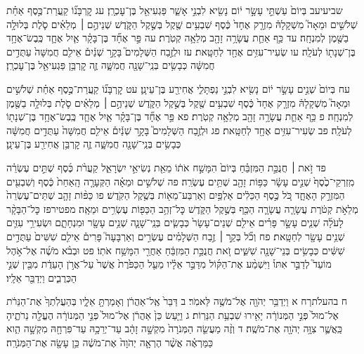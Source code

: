 \documentclass[twoside, openany, parskip=half, 11pt]{book}
\begin{document}
שביעיעב בְּיוֹם֙ עַשְׁתֵּ֣י עָשָׂ֣ר י֔וֹם נָשִׂ֖יא לִבְנֵ֣י אָשֵׁ֑ר פַּגְעִיאֵ֖ל בֶּן־עׇכְרָֽן׃ עג קׇרְבָּנ֞וֹ קַֽעֲרַת־כֶּ֣סֶף אַחַ֗ת שְׁלֹשִׁ֣ים וּמֵאָה֮ מִשְׁקָלָהּ֒ מִזְרָ֤ק אֶחָד֙ כֶּ֔סֶף שִׁבְעִ֥ים שֶׁ֖קֶל בְּשֶׁ֣קֶל הַקֹּ֑דֶשׁ שְׁנֵיהֶ֣ם ׀ מְלֵאִ֗ים סֹ֛לֶת בְּלוּלָ֥ה בַשֶּׁ֖מֶן לְמִנְחָֽה׃ עד כַּ֥ף אַחַ֛ת עֲשָׂרָ֥ה זָהָ֖ב מְלֵאָ֥ה קְטֹֽרֶת׃ עה פַּ֣ר אֶחָ֞ד בֶּן־בָּקָ֗ר אַ֧יִל אֶחָ֛ד כֶּֽבֶשׂ־אֶחָ֥ד בֶּן־שְׁנָת֖וֹ לְעֹלָֽה׃ עו שְׂעִיר־עִזִּ֥ים אֶחָ֖ד לְחַטָּֽאת׃ עז וּלְזֶ֣בַח הַשְּׁלָמִים֮ בָּקָ֣ר שְׁנַ֒יִם֒ אֵילִ֤ם חֲמִשָּׁה֙ עַתֻּדִ֣ים חֲמִשָּׁ֔ה כְּבָשִׂ֥ים בְּנֵֽי־שָׁנָ֖ה חֲמִשָּׁ֑ה זֶ֛ה קׇרְבַּ֥ן פַּגְעִיאֵ֖ל בֶּן־עׇכְרָֽן׃

עח בְּיוֹם֙ שְׁנֵ֣ים עָשָׂ֣ר י֔וֹם נָשִׂ֖יא לִבְנֵ֣י נַפְתָּלִ֑י אֲחִירַ֖ע בֶּן־עֵינָֽן׃ עט קׇרְבָּנ֞וֹ קַֽעֲרַת־כֶּ֣סֶף אַחַ֗ת שְׁלֹשִׁ֣ים וּמֵאָה֮ מִשְׁקָלָהּ֒ מִזְרָ֤ק אֶחָד֙ כֶּ֔סֶף שִׁבְעִ֥ים שֶׁ֖קֶל בְּשֶׁ֣קֶל הַקֹּ֑דֶשׁ שְׁנֵיהֶ֣ם ׀ מְלֵאִ֗ים סֹ֛לֶת בְּלוּלָ֥ה בַשֶּׁ֖מֶן לְמִנְחָֽה׃ פ כַּ֥ף אַחַ֛ת עֲשָׂרָ֥ה זָהָ֖ב מְלֵאָ֥ה קְטֹֽרֶת׃ פא פַּ֣ר אֶחָ֞ד בֶּן־בָּקָ֗ר אַ֧יִל אֶחָ֛ד כֶּֽבֶשׂ־אֶחָ֥ד בֶּן־שְׁנָת֖וֹ לְעֹלָֽה׃ פב שְׂעִיר־עִזִּ֥ים אֶחָ֖ד לְחַטָּֽאת׃ פג וּלְזֶ֣בַח הַשְּׁלָמִים֮ בָּקָ֣ר שְׁנַ֒יִם֒ אֵילִ֤ם חֲמִשָּׁה֙ עַתֻּדִ֣ים חֲמִשָּׁ֔ה כְּבָשִׂ֥ים בְּנֵֽי־שָׁנָ֖ה חֲמִשָּׁ֑ה זֶ֛ה קׇרְבַּ֥ן אֲחִירַ֖ע בֶּן־עֵינָֽן׃

פד זֹ֣את ׀ חֲנֻכַּ֣ת הַמִּזְבֵּ֗חַ בְּיוֹם֙ הִמָּשַׁ֣ח אֹת֔וֹ מֵאֵ֖ת נְשִׂיאֵ֣י יִשְׂרָאֵ֑ל קַעֲרֹ֨ת כֶּ֜סֶף שְׁתֵּ֣ים עֶשְׂרֵ֗ה מִֽזְרְקֵי־כֶ֙סֶף֙ שְׁנֵ֣ים עָשָׂ֔ר כַּפּ֥וֹת זָהָ֖ב שְׁתֵּ֥ים עֶשְׂרֵֽה׃ פה שְׁלֹשִׁ֣ים וּמֵאָ֗ה הַקְּעָרָ֤ה הָֽאַחַת֙ כֶּ֔סֶף וְשִׁבְעִ֖ים הַמִּזְרָ֣ק הָאֶחָ֑ד כֹּ֚ל כֶּ֣סֶף הַכֵּלִ֔ים אַלְפַּ֥יִם וְאַרְבַּע־מֵא֖וֹת בְּשֶׁ֥קֶל הַקֹּֽדֶשׁ׃ פו כַּפּ֨וֹת זָהָ֤ב שְׁתֵּים־עֶשְׂרֵה֙ מְלֵאֹ֣ת קְטֹ֔רֶת עֲשָׂרָ֧ה עֲשָׂרָ֛ה הַכַּ֖ף בְּשֶׁ֣קֶל הַקֹּ֑דֶשׁ כׇּל־זְהַ֥ב הַכַּפּ֖וֹת עֶשְׂרִ֥ים וּמֵאָֽה׃ מפטירפז כׇּל־הַבָּקָ֨ר לָעֹלָ֜ה שְׁנֵ֧ים עָשָׂ֣ר פָּרִ֗ים אֵילִ֤ם שְׁנֵים־עָשָׂר֙ כְּבָשִׂ֧ים בְּנֵֽי־שָׁנָ֛ה שְׁנֵ֥ים עָשָׂ֖ר וּמִנְחָתָ֑ם וּשְׂעִירֵ֥י עִזִּ֛ים שְׁנֵ֥ים עָשָׂ֖ר לְחַטָּֽאת׃ פח וְכֹ֞ל בְּקַ֣ר ׀ זֶ֣בַח הַשְּׁלָמִ֗ים עֶשְׂרִ֣ים וְאַרְבָּעָה֮ פָּרִים֒ אֵילִ֤ם שִׁשִּׁים֙ עַתֻּדִ֣ים שִׁשִּׁ֔ים כְּבָשִׂ֥ים בְּנֵי־שָׁנָ֖ה שִׁשִּׁ֑ים זֹ֚את חֲנֻכַּ֣ת הַמִּזְבֵּ֔חַ אַחֲרֵ֖י הִמָּשַׁ֥ח אֹתֽוֹ׃ פט וּבְבֹ֨א מֹשֶׁ֜ה אֶל־אֹ֣הֶל מוֹעֵד֮ לְדַבֵּ֣ר אִתּוֹ֒ וַיִּשְׁמַ֨ע אֶת־הַקּ֜וֹל מִדַּבֵּ֣ר אֵלָ֗יו מֵעַ֤ל הַכַּפֹּ֙רֶת֙ אֲשֶׁר֙ עַל־אֲרֹ֣ן הָעֵדֻ֔ת מִבֵּ֖ין שְׁנֵ֣י הַכְּרֻבִ֑ים וַיְדַבֵּ֖ר אֵלָֽיו׃

ח בהעלֹתךח א וַיְדַבֵּ֥ר יְהֹוָ֖ה אֶל־מֹשֶׁ֥ה לֵּאמֹֽר׃ ב דַּבֵּר֙ אֶֽל־אַהֲרֹ֔ן וְאָמַרְתָּ֖ אֵלָ֑יו בְּהַעֲלֹֽתְךָ֙ אֶת־הַנֵּרֹ֔ת אֶל־מוּל֙ פְּנֵ֣י הַמְּנוֹרָ֔ה יָאִ֖ירוּ שִׁבְעַ֥ת הַנֵּרֽוֹת׃ ג וַיַּ֤עַשׂ כֵּן֙ אַהֲרֹ֔ן אֶל־מוּל֙ פְּנֵ֣י הַמְּנוֹרָ֔ה הֶעֱלָ֖ה נֵרֹתֶ֑יהָ כַּֽאֲשֶׁ֛ר צִוָּ֥ה יְהֹוָ֖ה אֶת־מֹשֶֽׁה׃ ד וְזֶ֨ה מַעֲשֵׂ֤ה הַמְּנֹרָה֙ מִקְשָׁ֣ה זָהָ֔ב עַד־יְרֵכָ֥הּ עַד־פִּרְחָ֖הּ מִקְשָׁ֣ה הִ֑וא כַּמַּרְאֶ֗ה אֲשֶׁ֨ר הֶרְאָ֤ה יְהֹוָה֙ אֶת־מֹשֶׁ֔ה כֵּ֥ן עָשָׂ֖ה אֶת־הַמְּנֹרָֽה׃
\end{document}
